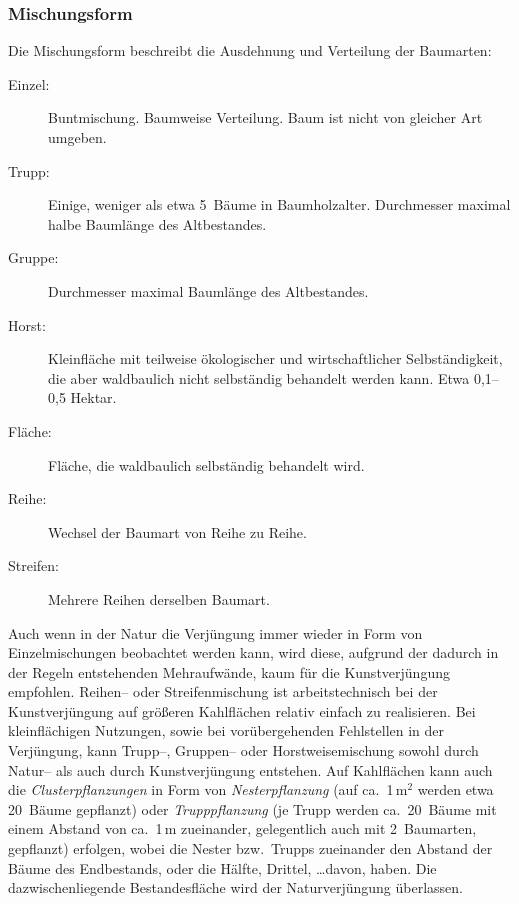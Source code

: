 \documentclass[twocolumn]{scrartcl}
\begin{document}
\subsubsection{Mischungsform}
\label{sssec:mischungsform}

Die Mischungsform beschreibt die Ausdehnung und Verteilung der
Baumarten:

\begin{description}
\item[Einzel:] Buntmischung. Baumweise Verteilung. Baum ist nicht von gleicher Art umgeben.
\item[Trupp:] Einige, weniger als etwa 5~Bäume in Baumholzalter. Durchmesser maximal halbe Baumlänge des Altbestandes.
\item[Gruppe:] Durchmesser maximal Baumlänge des Altbestandes.
\item[Horst:] Kleinfläche mit teilweise ökologischer und wirtschaftlicher Selbständigkeit, die aber waldbaulich nicht selbständig behandelt werden kann. Etwa 0,1--0,5 Hektar.
\item[Fläche:] Fläche, die waldbaulich selbständig behandelt wird.
\item[Reihe:] Wechsel der Baumart von Reihe zu Reihe.
\item[Streifen:] Mehrere Reihen derselben Baumart.
\end{description}

Auch wenn in der Natur die Verjüngung immer wieder in Form von
Einzelmischungen beobachtet werden kann, wird diese, aufgrund der
dadurch in der Regeln entstehenden Mehraufwände, kaum für die
Kunstverjüngung empfohlen. Reihen-- oder Streifenmischung ist
arbeitstechnisch bei der Kunstverjüngung auf größeren Kahlflächen
relativ einfach zu realisieren. Bei kleinflächigen Nutzungen, sowie
bei vorübergehenden Fehlstellen in der Verjüngung, kann Trupp--,
Gruppen-- oder Horstweisemischung sowohl durch Natur-- als auch durch
Kunstverjüngung entstehen. Auf Kahlflächen kann auch die
\emph{Clusterpflanzungen} in Form von \emph{Nesterpflanzung} (auf ca.\
1\,m$^2$ werden etwa 20~Bäume gepflanzt) oder \emph{Trupppflanzung}
(je Trupp werden ca.\ 20~Bäume mit einem Abstand von ca.\ 1\,m
zueinander, gelegentlich auch mit 2~Baumarten, gepflanzt) erfolgen,
wobei die Nester bzw.\ Trupps zueinander den Abstand der Bäume des
Endbestands, oder die Hälfte, Drittel, \dots davon, haben. Die
dazwischenliegende Bestandesfläche wird der Naturverjüngung
überlassen.
\end{document}
